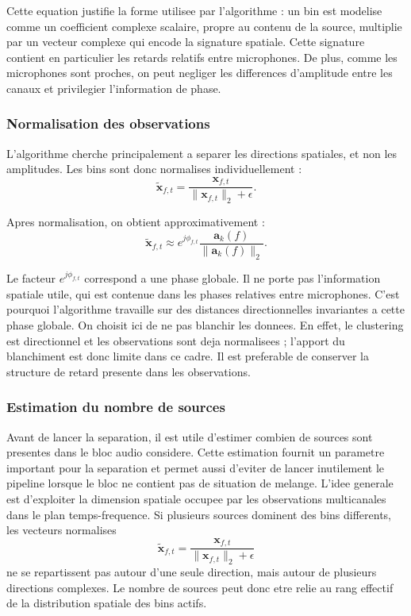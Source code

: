 \documentclass[11pt,a4paper]{article}
\begin{document}
Cette equation justifie la forme utilisee par l'algorithme : un bin est modelise
comme un coefficient complexe scalaire, propre au contenu de la source, multiplie
par un vecteur complexe qui encode la signature spatiale. Cette signature
contient en particulier les retards relatifs entre microphones. De plus, comme
les microphones sont proches, on peut negliger les differences d'amplitude entre
les canaux et privilegier l'information de phase.

\subsubsection{Normalisation des observations}

L'algorithme cherche principalement a separer les directions spatiales, et non
les amplitudes. Les bins sont donc normalises individuellement :
\[
  \tilde{\mathbf{x}}_{f,t}
    =
    \frac{\mathbf{x}_{f,t}}
         {\|\mathbf{x}_{f,t}\|_2 + \epsilon}.
\]

Apres normalisation, on obtient approximativement :
\[
  \tilde{\mathbf{x}}_{f,t}
    \approx
    e^{j\phi_{f,t}}
    \frac{\mathbf{a}_k(f)}{\|\mathbf{a}_k(f)\|_2}.
\]

Le facteur $e^{j\phi_{f,t}}$ correspond a une phase globale. Il ne porte pas
l'information spatiale utile, qui est contenue dans les phases relatives entre
microphones. C'est pourquoi l'algorithme travaille sur des distances
directionnelles invariantes a cette phase globale.
On choisit ici de ne pas blanchir les donnees. En effet, le clustering est
directionnel et les observations sont deja normalisees ; l'apport du
blanchiment est donc limite dans ce cadre. Il est preferable de conserver la
structure de retard presente dans les observations.

\subsubsection{Estimation du nombre de sources}

Avant de lancer la separation, il est utile d'estimer combien de sources sont
presentes dans le bloc audio considere. Cette estimation fournit un parametre
important pour la separation et permet aussi d'eviter de lancer inutilement le
pipeline lorsque le bloc ne contient pas de situation de melange. L'idee
generale est d'exploiter la
dimension spatiale occupee par les observations multicanales dans le plan
temps-frequence. Si plusieurs sources dominent des bins differents, les vecteurs
normalises
\[
  \tilde{\mathbf{x}}_{f,t}
    =
    \frac{\mathbf{x}_{f,t}}
         {\|\mathbf{x}_{f,t}\|_2+\epsilon}
\]
ne se repartissent pas autour d'une seule direction, mais autour de plusieurs
directions complexes. Le nombre de sources peut donc etre relie au rang effectif
de la distribution spatiale des bins actifs.
\end{document}
